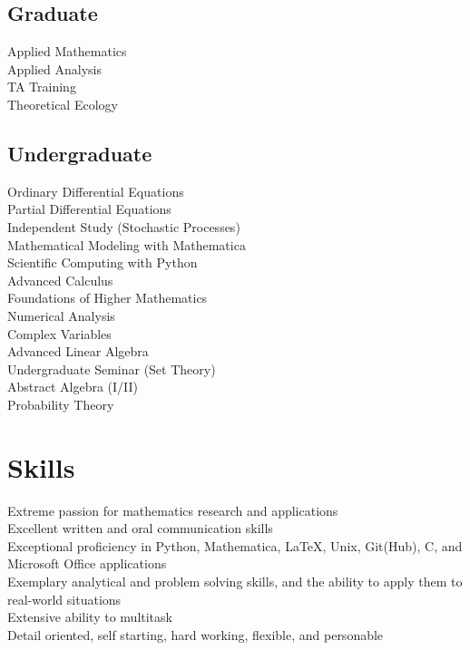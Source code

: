 \documentclass[letterpaper]{deedy-resume} %
\begin{document}
\begin{minipage}[t]{0.33\textwidth}
\subsection{Graduate}

Applied Mathematics \\
Applied Analysis \\
TA Training \\
Theoretical Ecology

\vspace{7pt} %


\subsection{Undergraduate}

Ordinary Differential Equations \\
Partial Differential Equations \\
Independent Study (Stochastic Processes) \\
Mathematical Modeling with Mathematica \\
Scientific Computing with Python \\
Advanced Calculus \\
Foundations of Higher Mathematics \\
Numerical Analysis \\
Complex Variables \\
Advanced Linear Algebra \\
Undergraduate Seminar (Set Theory) \\
Abstract Algebra (I/II)\\
Probability Theory \\

\vspace{7pt} %


\section{Skills}
\textbullet{} Extreme passion for mathematics research and applications\\
\textbullet{} Excellent written and oral communication skills\\
\textbullet{} Exceptional proficiency in Python, Mathematica, \LaTeX, Unix, Git(Hub), C, and Microsoft Office applications\\
\textbullet{} Exemplary analytical and problem solving skills, and the ability to apply them to real-world situations\\
\textbullet{} Extensive ability to multitask\\
\textbullet{} Detail oriented, self starting, hard working, flexible, and personable


\end{minipage}
\end{document}
